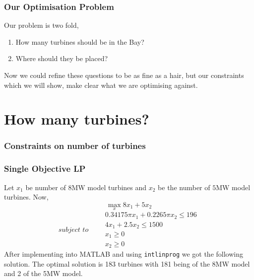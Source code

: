 \documentclass{beamer}
\begin{document}
  \begin{frame}
    \frametitle{Our Optimisation Problem}
    Our problem is two fold,\pause
    \begin{enumerate}
      \item How many turbines should be in the Bay?\pause
      \item Where should they be placed?\pause
    \end{enumerate}
    Now we could refine these questions to be as fine as a hair, but our constraints which we will show, make clear what we are optimising against.
  \end{frame}

  \section{How many turbines?}
  \begin{frame}
    \frametitle{Constraints on number of turbines}
    \begin{table}[]
    \centering
    \end{table}
  \end{frame}

\begin{frame}
  \frametitle{Single Objective LP}
  Let $x_1$ be number of $8$MW model turbines and $x_2$ be the number of $5$MW model turbines. \pause Now,
  $$ \max_{x} 8x_1 + 5x_2 $$
  $$ subject\,\, to \qquad\begin{matrix}
    0.34175\pi x_1 + 0.2265\pi x_2 \le 196\\
    4x_1 + 2.5x_2 \le 1500\\
    x_1 \ge 0\\
    x_2 \ge 0
  \end{matrix} $$\pause
  After implementing into MATLAB and using \texttt{intlinprog} we got the following solution. The optimal solution is 183 turbines with 181 being of the 8MW model and 2 of the 5MW model.
\end{frame}
\end{document}

